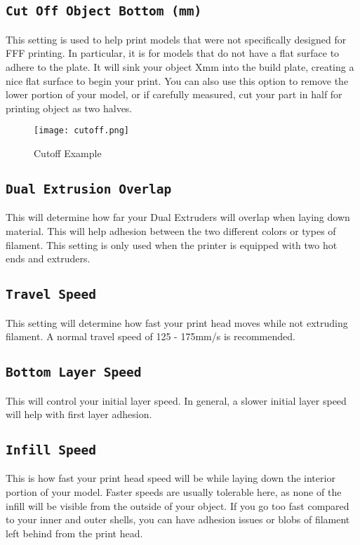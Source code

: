 \subsection{\texttt{Cut Off Object Bottom (mm)}}
This setting is used to help print models that were not specifically designed for FFF printing. In particular, it is for models that do not have a flat surface to adhere to the plate. It will sink your object Xmm into the build plate, creating a nice flat surface to begin your print. You can also use this option to remove the lower portion of your model, or if carefully measured, cut your part in half for printing object as two halves.
\begin{figure}[H]
\centering
\texttt{[image: cutoff.png]}
\caption{Cutoff Example}
\label{fig:Cutoff Example}
\end{figure}

\subsection{\texttt{Dual Extrusion Overlap}}
This will determine how far your Dual Extruders will overlap when laying down material. This will help adhesion between the two different colors or types of filament. This setting is only used when the printer is equipped with two hot ends and extruders.

\subsection{\texttt{Travel Speed}}
This setting will determine how fast your print head moves while not extruding filament. A normal travel speed of 125 - 175mm/s is recommended.

\subsection{\texttt{Bottom Layer Speed}}
This will control your initial layer speed. In general, a slower initial layer speed will help with first layer adhesion. 

\subsection{\texttt{Infill Speed}}
This is how fast your print head speed will be while laying down the interior portion of your model. Faster speeds are usually tolerable here, as none of the infill will be visible from the outside of your object. If you go too fast compared to your inner and outer shells, you can have adhesion issues or blobs of filament left behind from the print head.

